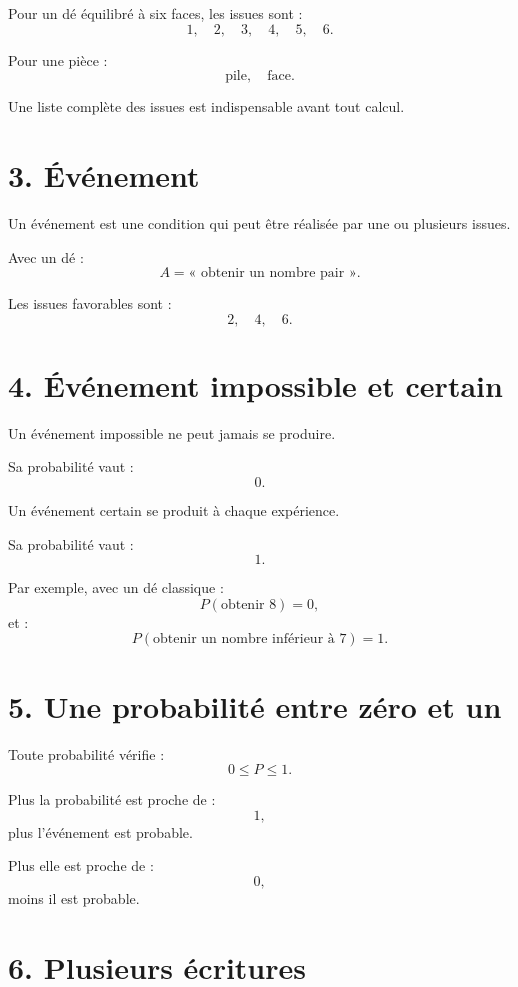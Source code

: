 Pour un dé équilibré à six faces, les issues sont :
\[
1,\quad2,\quad3,\quad4,\quad5,\quad6.
\]

Pour une pièce :
\[
\text{pile},\quad\text{face}.
\]

Une liste complète des issues est indispensable avant tout calcul.


\section{3. Événement}

\begin{definition}
Un événement est une condition qui peut être réalisée par une ou plusieurs issues.
\end{definition}

Avec un dé :
\[
A=\text{« obtenir un nombre pair »}.
\]

Les issues favorables sont :
\[
2,\quad4,\quad6.
\]

\section{4. Événement impossible et certain}

Un événement impossible ne peut jamais se produire.

Sa probabilité vaut :
\[
0.
\]

Un événement certain se produit à chaque expérience.

Sa probabilité vaut :
\[
1.
\]

Par exemple, avec un dé classique :
\[
P(\text{obtenir }8)=0,
\]
et :
\[
P(\text{obtenir un nombre inférieur à }7)=1.
\]

\section{5. Une probabilité entre zéro et un}

Toute probabilité vérifie :
\[
\boxed{0\le P\le1}.
\]

Plus la probabilité est proche de :
\[
1,
\]
plus l'événement est probable.

Plus elle est proche de :
\[
0,
\]
moins il est probable.

\section{6. Plusieurs écritures}

